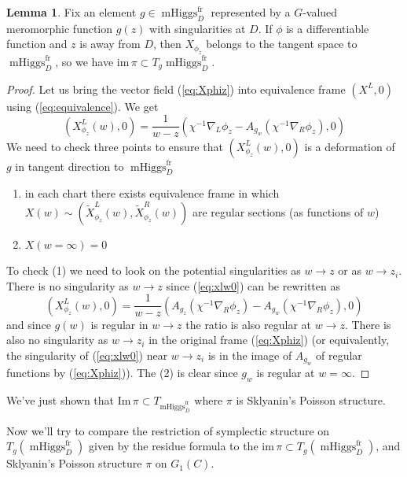\documentclass[11pt, oneside, reqno]{amsart}
\theoremstyle{definition} \newtheorem{definition}{Definition}[section]
\newtheorem{lemma}[definition]{Lemma}
\theoremstyle{definition} \newtheorem{remark}[definition]{Remark}
\theoremstyle{definition} \newtheorem{remarks}[definition]{Remarks}
\theoremstyle{definition} \newtheorem{question}[definition]{Question}
\theoremstyle{definition} \newtheorem*{note}{Note}
\theoremstyle{definition} \newtheorem{example}[definition]{Example}
\theoremstyle{definition} \newtheorem{examples}[definition]{Examples}
\DeclareMathOperator{\mhiggs}{mHiggs}
\newcommand{\fr}{\mathrm{fr}}
\begin{document}
\begin{lemma}\label{phitoX}
  Fix an element $g \in \mhiggs^{\fr}_{D}$ represented by a $G$-valued
  meromorphic function $g(z)$ with singularities at $D$.    If $\phi$ is a differentiable function and $z$ is away from $D$, then $X_{\phi_z}$
  belongs to the tangent space to $\mhiggs^{\fr}_{D}$, so we have $\mathrm{im} \, \pi \subset T_{g}\mhiggs^{\fr}_D$. 
\end{lemma}
\begin{proof}
  Let us bring the vector field (\ref{eq:Xphiz}) into equivalence frame $(X^{L}, 0)$ using
  (\ref{eq:equivalence}). We get
  \begin{equation}
\label{eq:xlw0}
(X^L_{\phi_z} (w) , 0) =  \frac{1}{w - z} ( \chi^{-1} \nabla_{L} \phi_z  - A_{g_{w}} (\chi^{-1}\nabla_{R} \phi_{z}), 0 )
  \end{equation}
  We need to check three points to ensure that $(X^L_{\phi_z} (w) , 0) $ is a deformation
  of $g$ in tangent direction to $\mhiggs^{\fr}_{D}$
  \begin{enumerate}
  \item in each chart there exists equivalence frame in which $X(w) \sim (\tilde X_{\phi_{z}}^{L}(w), \tilde X_{\phi_{z}}^{R}(w))$  are regular sections (as functions of $w$)
  \item $X(w = \infty) = 0$
  \end{enumerate}
  To check (1) we need to look on the potential singularities as $w \to z$ or as $w \to z_i$.
  There is no singularity as $w \to z$ since (\ref{eq:xlw0}) can be rewritten
  as
  \begin{equation}
\label{eq:sklyanin-left}
(X^L_{\phi_z} (w) , 0)  =     \frac{1}{w - z} ( A_{g_z}( \chi^{-1} \nabla_{R} \phi_z)  - A_{g_{w}} (\chi^{-1}\nabla_{R} \phi_{z}),0)
  \end{equation}
  and since $g(w)$ is regular in $w \to z$ the ratio is also regular at $w \to z$.
  There is also no singularity as $w \to z_i$ in the original frame (\ref{eq:Xphiz}) 
  (or equivalently, the singularity of (\ref{eq:xlw0}) near $w \to z_i$ 
  is in the image of $A_{g_{w}}$ of regular functions by (\ref{eq:Xphiz})).
 The (2) is clear since $g_{w}$ is regular at $w = \infty$. 
\end{proof}



We've just shown that $\mathrm{Im} \, \pi \subset T_{\mhiggs^{\fr}_{D}}$ where
$\pi$ is Sklyanin's Poisson structure. 

Now we'll try to compare the restriction of symplectic
structure on $T_{g}(\mhiggs^{\fr}_{D})$ given by the residue formula to the $\mathrm{im} \, \pi
\subset T_{g}(\mhiggs^{\fr}_D)$, and Sklyanin's Poisson structure $\pi$ on $G_1(C)$. 
\end{document}
